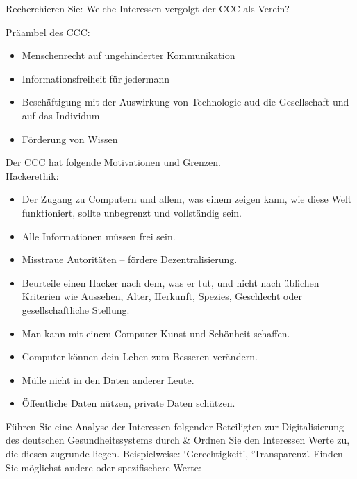 \documentclass[a4paper]{assignment}
\date{17 November 2024}
\begin{document}
\begin{problemlist}

\pbitem Recherchieren Sie: Welche Interessen vergolgt der CCC als Verein?

\begin{answer}

Präambel des CCC:\cite{ccc-satzung}
\begin{itemize}
\item Menschenrecht auf ungehinderter Kommunikation
\item Informationsfreiheit für jedermann
\item Beschäftigung mit der Auswirkung von Technologie aud die Gesellschaft und auf das Individum
\item Förderung von Wissen
\end{itemize}

Der CCC hat folgende Motivationen und Grenzen.\\
Hackerethik:\cite{ccc-hackerethik}
\begin{itemize}
\item Der Zugang zu Computern und allem, was einem zeigen kann, wie diese Welt funktioniert, sollte unbegrenzt und vollständig sein.
\item Alle Informationen müssen frei sein.
\item Misstraue Autoritäten – fördere Dezentralisierung.
\item Beurteile einen Hacker nach dem, was er tut, und nicht nach üblichen Kriterien wie Aussehen, Alter, Herkunft, Spezies, Geschlecht oder gesellschaftliche Stellung.
\item Man kann mit einem Computer Kunst und Schönheit schaffen.
\item Computer können dein Leben zum Besseren verändern.
\item Mülle nicht in den Daten anderer Leute.
\item Öffentliche Daten nützen, private Daten schützen.
\end{itemize}

\end{answer}




\newpage
\pbitem Führen Sie eine Analyse der Interessen folgender Beteiligten zur Digitalisierung des deutschen Gesundheitssystems durch \& Ordnen Sie den Interessen Werte zu, die diesen zugrunde liegen. Beispielweise: ‘Gerechtigkeit’, ‘Transparenz’. Finden Sie möglichst andere oder spezifischere Werte:


\end{problemlist}
\end{document}
